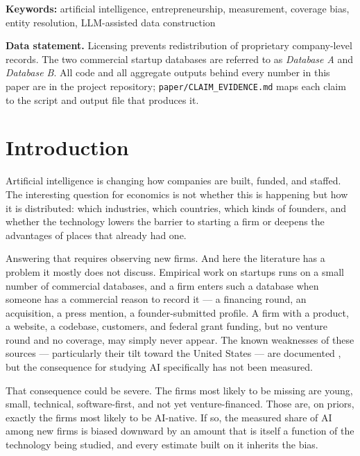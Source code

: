 \documentclass[11pt]{article}
\begin{document}
\medskip
\noindent\textbf{Keywords:} artificial intelligence, entrepreneurship,
measurement, coverage bias, entity resolution, LLM-assisted data construction

\vspace{0.8em}
\noindent\textbf{Data statement.} Licensing prevents redistribution of
proprietary company-level records. The two commercial startup databases are
referred to as \emph{Database A} and \emph{Database B}. All code and all
aggregate outputs behind every number in this paper are in the project
repository; \texttt{paper/CLAIM\_EVIDENCE.md} maps each claim to the script and
output file that produces it.

\newpage
\tableofcontents
\newpage

\section{Introduction}

Artificial intelligence is changing how companies are built, funded, and
staffed. The interesting question for economics is not whether this is
happening but how it is distributed: which industries, which countries, which
kinds of founders, and whether the technology lowers the barrier to starting a
firm or deepens the advantages of places that already had one.

Answering that requires observing new firms. And here the literature has a
problem it mostly does not discuss. Empirical work on startups runs on a small
number of commercial databases, and a firm enters such a database when someone
has a commercial reason to record it --- a financing round, an acquisition, a
press mention, a founder-submitted profile. A firm with a product, a website, a
codebase, customers, and federal grant funding, but no venture round and no
coverage, may simply never appear. The known weaknesses of these sources ---
particularly their tilt toward the United States --- are documented
\citep{dalle2017crunchbase}, but the consequence for studying AI specifically
has not been measured.

That consequence could be severe. The firms most likely to be missing are
young, small, technical, software-first, and not yet venture-financed. Those
are, on priors, exactly the firms most likely to be AI-native. If so, the
measured share of AI among new firms is biased downward by an amount that is
itself a function of the technology being studied, and every estimate built on
it inherits the bias.
\end{document}
